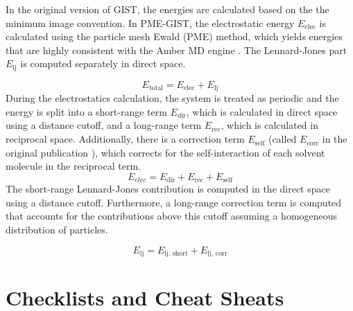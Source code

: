 \documentclass[9pt,tutorial]{livecoms}
\begin{document}
In the original version of GIST, the energies are calculated based on the the minimum image convention.
In PME-GIST, the electrostatic energy $E_\text{elec}$ is calculated using the particle mesh Ewald (PME) method, which yields energies that are highly consistent with the Amber MD engine \cite{Chen2021}.
The Lennard-Jones part $E_\text{lj}$ is computed separately in direct space.

\begin{equation}
	E_\text{total} = E_\text{elec} + E_\text{lj}
\end{equation}
During the electrostatics calculation, the system is treated as periodic and the energy is split into a short-range term $E_\text{dir}$, which is calculated in direct space using a distance cutoff, and a long-range term $E_\text{rec}$, which is calculated in reciprocal space.
Additionally, there is a correction term $E_\text{self}$ (called $E_\text{corr}$ in the original publication \cite{Chen2021}), which corrects for the self-interaction of each solvent molecule in the reciprocal term.
\begin{equation}
	E_\textit{elec} = E_\text{dir} + E_\text{rec} + E_\text{self}
\end{equation}
The short-range Lennard-Jones contribution is computed in the direct space using a distance cutoff.
Furthermore, a long-range correction term is computed that accounts for the contributions above this cutoff assuming a homogeneous distribution of particles.

\begin{equation}
	E_\text{lj} = E_\text{lj,\ short} +  E_\text{lj,\ corr}
\end{equation}

\section{Checklists and Cheat Sheats} \label{sec:checklists}
\end{document}
